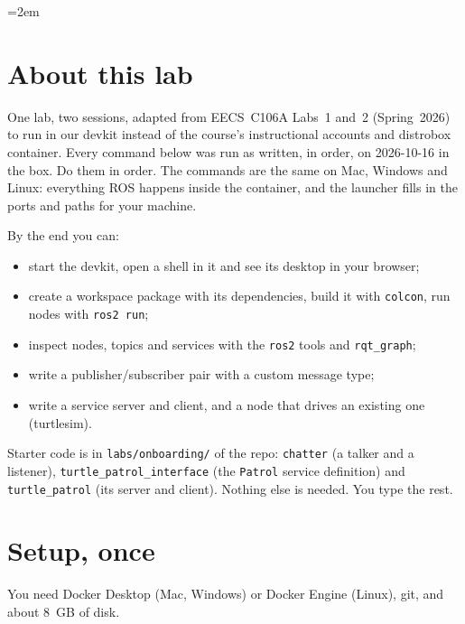 \documentclass[11pt,a4paper]{article}
\begin{document}
\emergencystretch=2em

\section*{About this lab}

One lab, two sessions, adapted from EECS~C106A Labs~1 and~2 (Spring~2026) to run in our devkit
instead of the course's instructional accounts and distrobox container. Every command below was
run as written, in order, on 2026-10-16 in the box. Do them in order. The
commands are the same on Mac, Windows and Linux: everything ROS happens inside the container,
and the launcher fills in the ports and paths for your machine.

By the end you can:
\begin{itemize}
  \item start the devkit, open a shell in it and see its desktop in your browser;
  \item create a workspace package with its dependencies, build it with \texttt{colcon}, run nodes with \texttt{ros2 run};
  \item inspect nodes, topics and services with the \texttt{ros2} tools and \texttt{rqt\_graph};
  \item write a publisher/subscriber pair with a custom message type;
  \item write a service server and client, and a node that drives an existing one (turtlesim).
\end{itemize}

Starter code is in \texttt{labs/onboarding/} of the repo: \texttt{chatter} (a talker and a
listener), \texttt{turtle\_patrol\_interface} (the \texttt{Patrol} service definition) and
\texttt{turtle\_patrol} (its server and client). Nothing else is needed. You type the rest.

\section{Setup, once}

You need Docker Desktop (Mac, Windows) or Docker Engine (Linux), git, and about 8~GB of disk.
\end{document}
